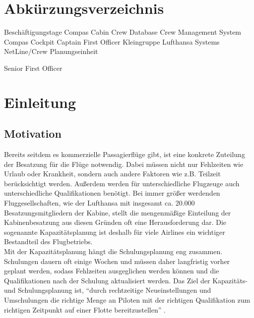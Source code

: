 \documentclass [12pt, a4paper, oneside, titlepage, ngerman]{article}
\begin{document}
\tableofcontents
\newpage




\section*{Abkürzungsverzeichnis}

\begin{acronym}[NL/C]

 {Beschäftigungstage}
 {Compas Cabin}
 {Crew Database}
 {Crew Management System}
 {Compas Cockpit}
 {Captain}
 {First Officer}
 {Kleingruppe}
 {Lufthansa Systems}
 {NetLine/Crew}
 {Planungseinheit}

 {Senior First Officer}



\end{acronym}
\newpage


\listoffigures
\newpage


\setcounter{page}{1}
\section{Einleitung}
\subsection {Motivation}

Bereits seitdem es kommerzielle Passagierflüge gibt, ist eine konkrete Zuteilung der Besatzung für die Flüge notwendig. Dabei müssen nicht nur Fehlzeiten wie Urlaub oder Krankheit, sondern auch andere Faktoren wie z.B. Teilzeit berücksichtigt werden. Außerdem werden für unterschiedliche Flugzeuge auch unterschiedliche Qualifikationen benötigt. Bei immer größer werdenden Fluggesellschaften, wie der Lufthansa mit insgesamt ca. 20.000 Besatzungsmitgliedern der Kabine, stellt die mengenmäßige Einteilung der Kabinenbesatzung aus diesen Gründen oft eine Herausforderung dar. Die sogenannte Kapazitätsplanung ist deshalb für viele Airlines ein wichtiger Bestandteil des Flugbetriebs. \\
Mit der Kapazitätsplanung hängt die Schulungsplanung eng zusammen. Schulungen dauern oft einige Wochen und müssen daher langfristig vorher geplant werden, sodass Fehlzeiten ausgeglichen werden können und die Qualifikationen nach der Schulung aktualisiert werden. Das Ziel der Kapazitäts- und Schulungsplanung ist, "`durch rechtzeitige Neueinstellungen und Umschulungen die richtige Menge an Piloten mit der richtigen Qualifikation zum richtigen Zeitpunkt auf einer Flotte bereitzustellen"' \cite[vgl.][S.19]{compasdoku}. \\
\end{document}
